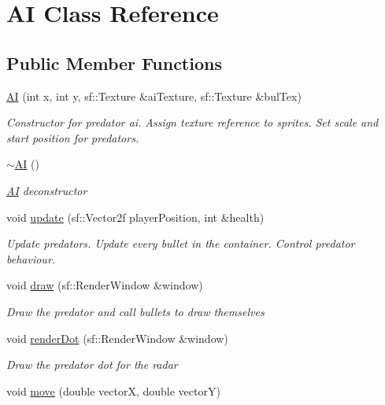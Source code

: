 \hypertarget{class_a_i}{}\section{AI Class Reference}
\label{class_a_i}
\subsection*{Public Member Functions}
\begin{DoxyCompactItemize}
\item 
\mbox{\hyperlink{class_a_i_a1d782247a4ef257300018bca8701d02e}{AI}} (int x, int y, sf\+::\+Texture \&ai\+Texture, sf\+::\+Texture \&bul\+Tex)
\begin{DoxyCompactList}\small\item\em Constructor for predator ai. Assign texture reference to sprites. Set scale and start position for predators. \end{DoxyCompactList}\item 
\mbox{\hyperlink{class_a_i_a66a8645f0c27285cd75346f2c2bbfb14}{$\sim$\+AI}} ()
\begin{DoxyCompactList}\small\item\em \mbox{\hyperlink{class_a_i}{AI}} deconstructor \end{DoxyCompactList}\item 
void \mbox{\hyperlink{class_a_i_ae8fa5ecda8a59f687bd75be465994467}{update}} (sf\+::\+Vector2f player\+Position, int \&health)
\begin{DoxyCompactList}\small\item\em Update predators. Update every bullet in the container. Control predator behaviour. \end{DoxyCompactList}\item 
void \mbox{\hyperlink{class_a_i_a4ccda3d254a3f604222423d15d4f767f}{draw}} (sf\+::\+Render\+Window \&window)
\begin{DoxyCompactList}\small\item\em Draw the predator and call bullets to draw themselves \end{DoxyCompactList}\item 
void \mbox{\hyperlink{class_a_i_a9394f659105b698a75e1fe77f6014e0b}{render\+Dot}} (sf\+::\+Render\+Window \&window)
\begin{DoxyCompactList}\small\item\em Draw the predator dot for the radar \end{DoxyCompactList}\item 
void \mbox{\hyperlink{class_a_i_a9761e86bf135a4ccf1b24326a5a01431}{move}} (double vectorX, double vectorY)

\end{DoxyCompactItemize}
